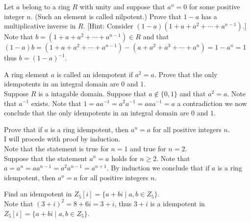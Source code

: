 \documentclass[12pt]{article}
\makeatletter
\theoremstyle{homework}
\newenvironment{exercise}[1]
{\def\@currentlabel{#1}\exercisecore}
{\endexercisecore}
\makeatother
\begin{document}
\begin{exercise}{13.15}
Let $a$ belong to a ring $R$ with unity and suppose that $a^n = 0$ for some positive integer $n$. (Such an element is called nilpotent.) Prove that $1 - a$ has a multiplicative inverse in $R$. [Hint: Consider $(1 - a)(1 + a + a^2 +\cdots +a^{n-1} )$.]\\
Note that $b=(1 + a + a^2 +\cdots +a^{n-1} )\in R$ and that $(1-a)b=(1 + a + a^2 +\cdots +a^{n-1} )-(a + a^2 + a^3 +\cdots +a^{n} )=1-a^n=1$ thus $b=(1-a)^{-1}$.
\end{exercise}

\begin{exercise}{13.18}
A ring element $a$ is called an idempotent if $a^2 = a$. Prove that the only idempotents in an integral domain are $0$ and $1$.\\
Suppose $R$ is a intagable domain.  Suppose that $a\not\in \{0,1\}$ and that $a^2=a$.  Note that $a^{-1}$ exists.  Note that $1=aa^{-1}=a^2a^{-1}=aaa^{-1}=a$ a contradiction we now conclude that the only idempotents in an integral domain are $0$ and $1$.
\end{exercise}

\begin{exercise}{13.22}
Prove that if $a$ is a ring idempotent, then $a^n=a$ for all positive integers $n$.\\
I will procede with proof by induction.\\
Note that the statement is true for $n=1$ and true for $n=2$.\\
Suppose that the statement $a^n=a$ holds for $n\geq 2$.  Note that $a=a^n=aa^{n-1}=a^2a^{n-1}=a^{n+1}$.  By induction we conclude that if $a$ is a ring idempotent, then $a^n=a$ for all positive integers $n$.
\end{exercise}

\begin{exercise}{13.25}
Find an idempotent in $Z_5 [i] = \{a + bi \mid a, b \in Z_5 \}$.\\
Note that $(3+i)^2=8+6i=3+i$, thus $3+i$ is a idempotent in $Z_5 [i] = \{a + bi \mid a, b \in Z_5 \}$.
\end{exercise}
\end{document}
